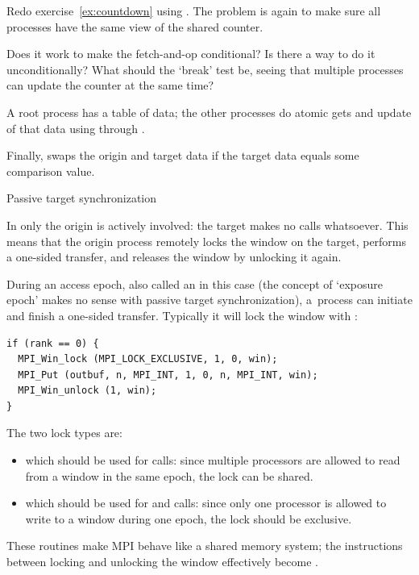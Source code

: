 \begin{exercise}
  \label{ex:countdownop}
  Redo exercise~\ref{ex:countdown} using . The
  problem is again to make sure all processes have the same view of
  the shared counter.

  Does it work to make the fetch-and-op conditional? Is there a way to
  do it unconditionally? What should the `break' test be, seeing that
  multiple processes can update the counter at the same time?
\end{exercise}

\begin{example}
  A root process has a table of data; the other processes do 
  atomic gets and update of that data using
   through .
\end{example}

Finally,  swaps the origin and
target data if the target data equals some comparison value.

 {Passive target synchronization}
\label{sec:passive-sync}

In  only the origin is
actively involved: the target makes no calls whatsoever.
This means that the origin process remotely locks the window
on the target, performs a one-sided transfer, and releases the window
by unlocking it again.

During an access epoch, also called an
 in this case
(the concept of `exposure epoch' makes no sense with passive target synchronization),
a~process can initiate and finish a one-sided
transfer. Typically it will lock the window with
:

\begin{lstlisting}
if (rank == 0) {
  MPI_Win_lock (MPI_LOCK_EXCLUSIVE, 1, 0, win);
  MPI_Put (outbuf, n, MPI_INT, 1, 0, n, MPI_INT, win);
  MPI_Win_unlock (1, win);
}
\end{lstlisting}
The two lock types are:
\begin{itemize}
\item {} which should be used for 
  calls: since multiple processors are allowed to read from a window
  in the same epoch, the lock can be shared.
\item {} which should be used for
   and  calls: since only one processor is
  allowed to write to a window during one epoch, the lock should be
  exclusive.
\end{itemize}
These routines make MPI behave like a shared memory system; the
instructions between locking and unlocking the window effectively
become .

